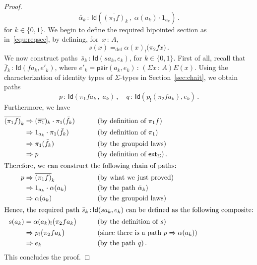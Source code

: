 \documentclass[10pt,a4paper,oneside,reqno]{amsart}
\numberwithin{equation}{section}
\theoremstyle{mythm}
\theoremstyle{mydef}
\theoremstyle{myrmk}
\newcommand{\deq}{=}
\newcommand{\defeq}{=_{\mathrm{def}}}
\newcommand{\co}{\,{:}\,}
\newcommand{\ct}{\cdot}
\newcommand{\ext}{\mathsf{ext}}
\newcommand{\Id}{\mathsf{Id}}
\newcommand{\pair}{\mathsf{pair}}
\begin{document}
\begin{proof}
\begin{equation*}
\bar{\alpha}_k \co  \Id( \overline{(\pi_1 f)}_k \, , \;  \alpha(a_k) \cdot 1_{a_k} ) \, . 
\end{equation*}
for $k \in \{ 0, 1 \}$. We begin to define the required bipointed section as in~\eqref{equ:reqsec}, by defining, for~$x \co A$, 
\begin{equation*}
s(x) \defeq \alpha(x)_{!} \big( \pi_2 f  x \big) \, .
\end{equation*}
We now construct  paths~$\bar{s}_k \co \Id(s a_k, e_k)$, for $k \in \{ 0, 1 \}$. First of all, recall that 
$\bar{f}_k \co \Id( f a_k, e'_k)$, where $e'_k = \pair(a_k, e_k) \co (\Sigma x \co A) E(x)$. Using the 
characterization of identity types of $\Sigma$-types in Section~\ref{sec:chait}, we obtain paths 
\begin{equation*}
\label{equ:usefulpath}
p \co  \Id( \pi_1 f  a_k \, ,\;   a_k )  \, , \quad q \co   \Id( p_{!}( \pi_2 f  a_k), e_k)   \, .
\end{equation*}
Furthermore, we have 
\begin{alignat*}{4}  
\overline{(\pi_1 f)}_k  & \Rightarrow  (\overline{\pi_1})_k \ct \pi_1(\bar{f}_k)  & & \qquad (\text{by definition of } \pi_1 f)   \\
& \Rightarrow  1_{a_k}  \ct \pi_1(\bar{f}_k)  & & \qquad (\text{by definition of } \pi_1)  \\
 & \Rightarrow \pi_1(\bar{f}_k) & & \qquad (\text{by the groupoid laws}) \\
 & \Rightarrow p  & & \qquad (\text{by definition of } \ext_\Sigma) \,  . \\
 \intertext{Therefore, we can construct the following chain of paths:}
p & \Rightarrow  \overline{(\pi_1 f)}_k & &  \qquad (\text{by what we just proved})  \\
  & \Rightarrow 1_{a_k} \ct  \alpha(a_k)  & &  \qquad (\text{by the path } \bar{\alpha}_k ) \\ 
  & \Rightarrow  \alpha(a_k)  & & \qquad (\text{by the groupoid laws}) \\
\intertext{Hence,  the required path $\bar{s}_k \co  \Id(s a_k,  e_k)$ can be defined as the following composite:}
s(a_k) & \deq \alpha(a_k)_{!} \big( \pi_2 f a_k   \big) & & \qquad (\text{by the definition of } s) \\
 &              \Rightarrow   p_{!} \big( \pi_2 f a_k   \big) & & \qquad (\text{since there is a path } p \Rightarrow \alpha(a_k)) \\
   &            \Rightarrow  e_k  & &  \qquad (\text{by the path } q)  \, .
   \end{alignat*} 
   This concludes the proof.
\end{proof}
\end{document}
